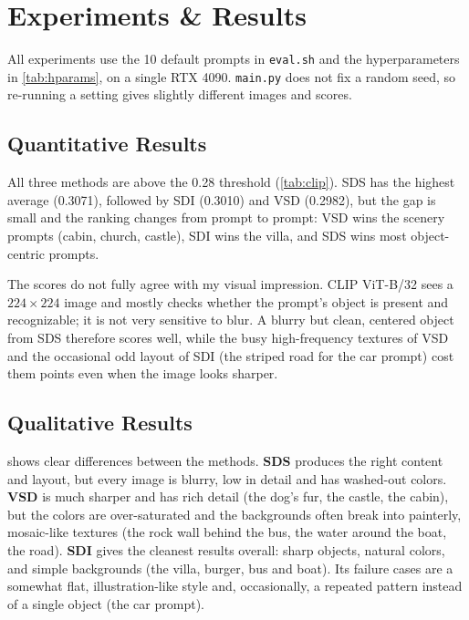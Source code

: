 \section{Experiments \& Results}
\label{sec:exp}


All experiments use the 10 default prompts in \texttt{eval.sh} and the hyperparameters in \cref{tab:hparams}, on a single RTX 4090.
\texttt{main.py} does not fix a random seed, so re-running a setting gives slightly different images and scores.

\subsection{Quantitative Results}
\label{sec:quantitative}



All three methods are above the 0.28 threshold (\cref{tab:clip}).
SDS has the highest average (0.3071), followed by SDI (0.3010) and VSD (0.2982), but the gap is small and the ranking changes from prompt to prompt: VSD wins the scenery prompts (cabin, church, castle), SDI wins the villa, and SDS wins most object-centric prompts.

The scores do not fully agree with my visual impression.
CLIP ViT-B/32 sees a $224\times224$ image and mostly checks whether the prompt's object is present and recognizable; it is not very sensitive to blur.
A blurry but clean, centered object from SDS therefore scores well, while the busy high-frequency textures of VSD and the occasional odd layout of SDI (\eg the striped road for the car prompt) cost them points even when the image looks sharper.

\subsection{Qualitative Results}
\label{sec:qualitative}

 shows clear differences between the methods.
\textbf{SDS} produces the right content and layout, but every image is blurry, low in detail and has washed-out colors.
\textbf{VSD} is much sharper and has rich detail (the dog's fur, the castle, the cabin), but the colors are over-saturated and the backgrounds often break into painterly, mosaic-like textures (the rock wall behind the bus, the water around the boat, the road).
\textbf{SDI} gives the cleanest results overall: sharp objects, natural colors, and simple backgrounds (the villa, burger, bus and boat).
Its failure cases are a somewhat flat, illustration-like style and, occasionally, a repeated pattern instead of a single object (the car prompt).

